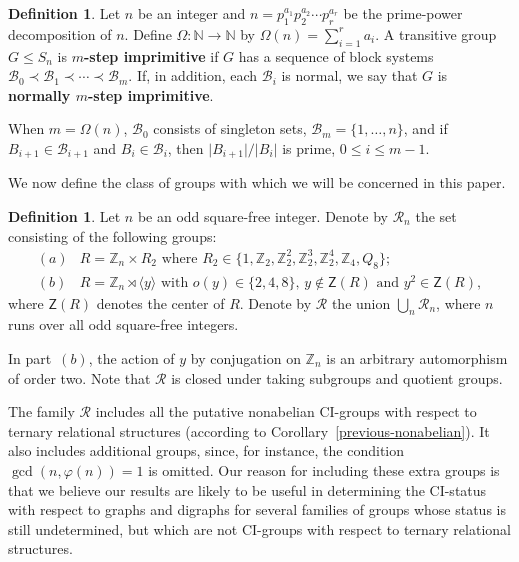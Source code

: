 \documentclass[11pt]{amsart}
\numberwithin{equation}{section}
\theoremstyle{definition}
\newtheorem{defin}[thrm]{Definition}
\def\Z{{\mathbb Z}}
\begin{document}
	
	
	\begin{defin}\label{mstep}
		Let $n$ be an integer and $n = p_1^{a_1}p_2^{a_2}\cdots p_r^{a_r}$ be the prime-power decomposition of $n$.  Define $\Omega\colon{\mathbb N}\to {\mathbb N}$ by $\Omega(n) = \sum_{i=1}^ra_i$.   A transitive group $G\le S_n$ is {\bf $m$-step imprimitive} if $G$ has a sequence of block systems ${\mathcal  B}_0 \prec{\mathcal  B}_1\prec \cdots \prec{\mathcal  B}_m$.  If, in addition, each ${\mathcal  B}_i$ is normal, we say that $G$ is {\bf normally $m$-step imprimitive}.
		
		When $m=\Omega(n)$, ${\mathcal  B}_0$ consists of singleton sets, ${\mathcal  B}_m = \{1,\ldots,n\}$, and if $B_{i+1}\in{\mathcal  B}_{i+1}$ and $B_i\in{\mathcal  B}_i$, then $\vert B_{i+1}\vert/\vert B_i\vert$ is prime, $0\le i\le m - 1$.
	\end{defin}
	
	We now define the class of groups with which we will be concerned in this paper.
	
	\begin{defin}\label{190921a}
		Let $n$ be an odd square-free integer. Denote by ${\mathcal R}_n$ the set consisting of the following groups:
		\begin{equation}
			\begin{array}{rl}
				(a) & R = \Z_n \times R_2 \text{ where } R_2 \in \{1, \Z_2, \Z_2^2, \Z_2^3, \Z_2^4, \Z_4, Q_8\};\\[3pt]
				(b) & R = \Z_n \rtimes \langle y \rangle \text{ with } o(y) \in \{2,4,8\},\, y \notin \mathsf{Z}(R) \text{ and } y^2 \in \mathsf{Z}(R),
			\end{array}
		\end{equation}
		where $\mathsf{Z}(R)$ denotes the center of $R$.
		Denote by ${\mathcal R}$ the union $\bigcup_n {\mathcal R}_n$, where $n$ runs over all odd square-free integers.
	\end{defin}
	
	In part~$(b)$, the action of $y$ by conjugation on $\Z_n$ is an arbitrary automorphism of order two. Note that $\mathcal R$ is closed under taking subgroups and quotient groups.
	
	The family $\mathcal R$ includes all the putative nonabelian CI-groups with respect to ternary relational structures (according to Corollary~\ref{previous-nonabelian}). It also includes additional groups, since, for instance, the condition $\gcd(n,\varphi(n))=1$ is omitted. Our reason for including these extra groups is that we believe our results are likely to be useful in determining the CI-status with respect to graphs and digraphs for several families of groups whose status is still undetermined, but which are not CI-groups with respect to ternary relational structures.
	
\end{document}
